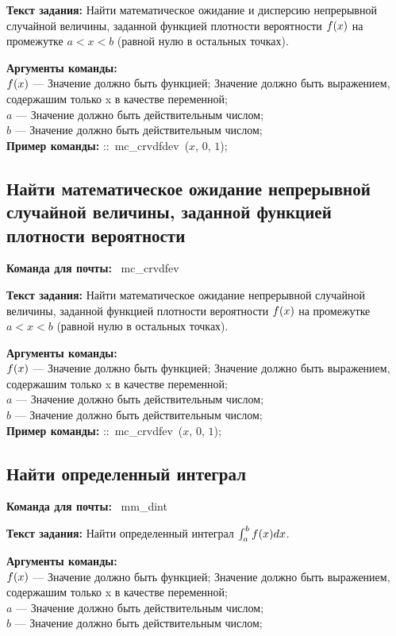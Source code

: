\noindent \textbf{Текст задания:} Найти математическое ожидание и дисперсию непрерывной случайной величины, заданной функцией плотности вероятности $f(x)$ на промежутке $a<x<b$ (равной нулю в остальных точках).

\noindent \textbf{Аргументы команды:}\\ $f(x)$ ---  Значение должно быть функцией; Значение должно быть выражением, содержашим только x в качестве переменной;\\
$a$ ---  Значение должно быть действительным числом;\\
$b$ ---  Значение должно быть действительным числом;\\
 

\noindent \textbf{Пример команды:} ::\mbox{ mc\_crvdfdev }($x$, $0$, $1$);

\subsection{Найти математическое ожидание непрерывной случайной величины, заданной функцией плотности вероятности}

\noindent \textbf{Команда для почты:} \mbox{ mc\_crvdfev }

\noindent \textbf{Текст задания:} Найти математическое ожидание непрерывной случайной величины, заданной функцией плотности вероятности $f(x)$ на промежутке $a<x<b$ (равной нулю в остальных точках).

\noindent \textbf{Аргументы команды:}\\ $f(x)$ ---  Значение должно быть функцией; Значение должно быть выражением, содержашим только x в качестве переменной;\\
$a$ ---  Значение должно быть действительным числом;\\
$b$ ---  Значение должно быть действительным числом;\\
 

\noindent \textbf{Пример команды:} ::\mbox{ mc\_crvdfev }($x$, $0$, $1$);

\subsection{Найти определенный интеграл}

\noindent \textbf{Команда для почты:} \mbox{ mm\_dint }

\noindent \textbf{Текст задания:} Найти определенный интеграл $\int^b_a f(x)dx$.

\noindent \textbf{Аргументы команды:}\\ $f(x)$ ---  Значение должно быть функцией; Значение должно быть выражением, содержашим только x в качестве переменной;\\
$a$ ---  Значение должно быть действительным числом;\\
$b$ ---  Значение должно быть действительным числом;\\
 

